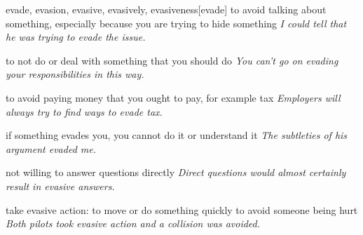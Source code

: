 \begin{word}{evade, evasion, evasive, evasively, evasiveness}[evade]
    to avoid talking about something, especially because you are trying to hide something
    \textit{I could tell that he was trying to evade the issue.}

    to not do or deal with something that you should do
    \textit{You can't go on evading your responsibilities in this way.}

    to avoid paying money that you ought to pay, for example tax
    \textit{Employers will always try to find ways to evade tax.}

    if something evades you, you cannot do it or understand it
    \textit{The subtleties of his argument evaded me.}

    not willing to answer questions directly
    \textit{Direct questions would almost certainly result in evasive answers.}

    take evasive action: to move or do something quickly to avoid someone being hurt
    \textit{Both pilots took evasive action and a collision was avoided.}
\end{word}